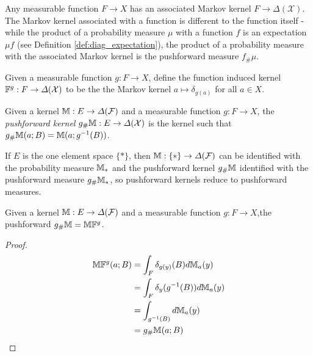 Any measurable function $F\to X$ has an associated Markov kernel $F\to \Delta(\mathcal{X})$. The Markov kernel associated with a function is different to the function itself - while the product of a probability measure $\mu$ with a function $f$ is an expectation $\mu f$ (see Definition \ref{def:diag_expectation}), the product of a probability measure with the associated Markov kernel is the pushforward measure $f_\# \mu$.

\begin{definition}\label{def:functional_kernel}
Given a measurable function $g:F\to X$, define the function induced kernel $\mathbb{F}^{g}:F\to \Delta(\mathcal{X})$ to be the the Markov kernel $a\mapsto \delta_{g(a)}$ for all $a\in X$.
\end{definition}

\begin{definition}
Given a kernel $\mathbb{M}:E\to \Delta(\mathcal{F})$ and a measurable function $g:F\to X$, the \emph{pushforward kernel} $g_\# \mathbb{M}:E\to \Delta(\mathcal{X})$ is the kernel such that $g_\# \mathbb{M} (a;B) = \mathbb{M}(a;g^{-1}(B))$.

If $E$ is the one element space $\{*\}$, then $\mathbb{M}:\{*\}\to \Delta(\mathcal{F})$ can be identified with the probability measure $\mathbb{M}_*$ and the pushforward kernel $g_{\#}\mathbb{M}$ identified with the pushforward measure $g_{\#} \mathbb{M}_*$, so pushforward kernels reduce to pushforward measures.
\end{definition}

\begin{lemma}\label{lem:pushf_funk}
Given a kernel $\mathbb{M}:E\to \Delta(\mathcal{F})$ and a measurable function $g:F\to X$,the pushforward $g_\# \mathbb{M} = \mathbb{M} \mathbb{F}^{g}$.
\end{lemma}

\begin{proof}
\begin{align}
	\mathbb{M}\mathbb{F}^g(a;B) &= \int_F \delta_{g(y)}(B) d\mathbb{M}_a(y)\\
								&= \int_F \delta_{y}(g^{-1}(B)) d\mathbb{M}_a(y)\\
								&= \int_{g^{-1}(B)} d\mathbb{M}_a(y)\\
								&= g_{\#} \mathbb{M} (a;B)
\end{align}
\end{proof}


